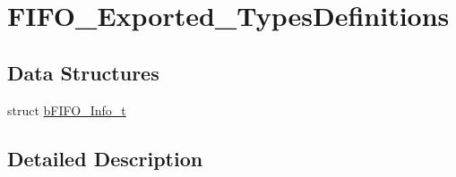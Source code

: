 \hypertarget{group___f_i_f_o___exported___types_definitions}{}\section{F\+I\+F\+O\+\_\+\+Exported\+\_\+\+Types\+Definitions}
\label{group___f_i_f_o___exported___types_definitions}
\subsection*{Data Structures}
\begin{DoxyCompactItemize}
\item 
struct \mbox{\hyperlink{structb_f_i_f_o___info__t}{b\+F\+I\+F\+O\+\_\+\+Info\+\_\+t}}
\end{DoxyCompactItemize}


\subsection{Detailed Description}
